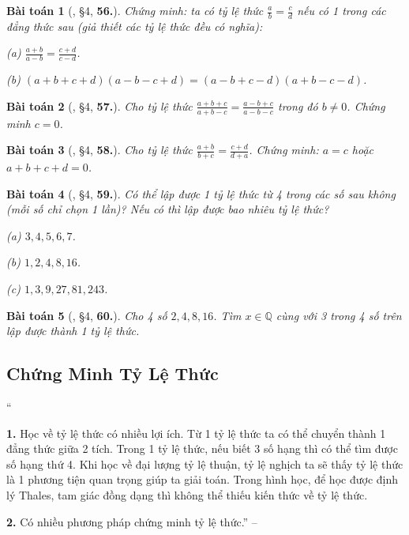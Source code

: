 \documentclass{article}
\numberwithin{equation}{section}
\newtheorem{baitoan}{Bài toán}
\begin{document}
\begin{baitoan}[\cite{Binh_Toan_7_tap_1}, \S4, \textbf{56.}]
	Chứng minh: ta có tỷ lệ thức $\frac{a}{b} = \frac{c}{d}$ nếu có 1 trong các đẳng thức sau (giả thiết các tỷ lệ thức đều có nghĩa):
	\begin{enumerate*}
		\item[(a)] $\frac{a + b}{a - b} = \frac{c + d}{c - d}$.
		\item[(b)] $(a + b + c + d)(a - b - c + d) = (a - b + c - d)(a + b - c - d)$.
	\end{enumerate*}
\end{baitoan}

\begin{baitoan}[\cite{Binh_Toan_7_tap_1}, \S4, \textbf{57.}]
	Cho tỷ lệ thức $\frac{a + b + c}{a + b - c} = \frac{a - b + c}{a - b - c}$ trong đó $b\ne 0$. Chứng minh $c = 0$.
\end{baitoan}

\begin{baitoan}[\cite{Binh_Toan_7_tap_1}, \S4, \textbf{58.}]
	Cho tỷ lệ thức $\frac{a + b}{b + c} = \frac{c + d}{d + a}$. Chứng minh: $a = c$ hoặc $a + b + c + d = 0$.
\end{baitoan}

\begin{baitoan}[\cite{Binh_Toan_7_tap_1}, \S4, \textbf{59.}]
	Có thể lập được 1 tỷ lệ thức từ 4 trong các số sau không (mỗi số chỉ chọn 1 lần)? Nếu có thì lập được bao nhiêu tỷ lệ thức?
	\begin{enumerate*}
		\item[(a)] $3,4,5,6,7$.
		\item[(b)] $1,2,4,8,16$.
		\item[(c)] $1,3,9,27,81,243$.
	\end{enumerate*}
\end{baitoan}

\begin{baitoan}[\cite{Binh_Toan_7_tap_1}, \S4, \textbf{60.}]
	Cho 4 số $2,4,8,16$. Tìm $x\in\mathbb{Q}$ cùng với 3 trong 4 số trên lập được thành 1 tỷ lệ thức.
\end{baitoan}


\subsection{Chứng Minh Tỷ Lệ Thức}
``\begin{enumerate*}
	\item[\textbf{1.}] Học về tỷ lệ thức có nhiều lợi ích. Từ 1 tỷ lệ thức ta có thể chuyển thành 1 đẳng thức giữa 2 tích. Trong 1 tỷ lệ thức, nếu biết 3 số hạng thì có thể tìm được số hạng thứ 4. Khi học về đại lượng tỷ lệ thuận, tỷ lệ nghịch ta sẽ thấy tỷ lệ thức là 1 phương tiện quan trọng giúp ta giải toán. Trong hình học, để học được định lý Thales, tam giác đồng dạng thì không thể thiếu kiến thức về tỷ lệ thức.
	\item[\textbf{2.}] Có nhiều phương pháp chứng minh tỷ lệ thức.'' -- \cite[Chap. 2, \S6, p. 28]{Tuyen_Toan_7}
\end{enumerate*}
\end{document}
